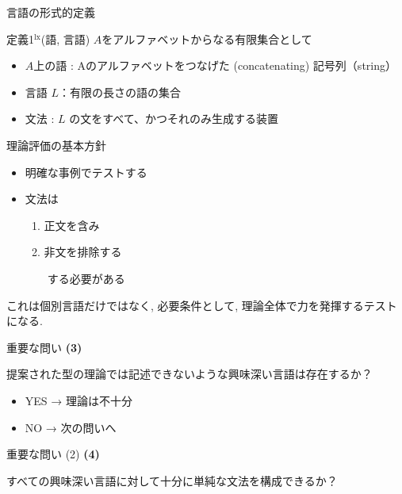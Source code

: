 \documentclass[dvipdfmx, xcolor={dvipsnames},12pt]{beamer}
\begin{document}
\begin{frame}{言語の形式的定義}

\begin{dfn}{定義1$^{\text{lx}}$(語, 言語)}
$A$をアルファベットからなる有限集合として
\begin{itemize}
\item $A$上の語 : Aのアルファベットをつなげた (concatenating) 記号列（string）
\item 言語 $L$：有限の長さの語の集合
\item 文法 : $L$ の文をすべて、かつそれのみ生成する装置
\end{itemize}
\end{dfn}

\end{frame}

\begin{frame}{理論評価の基本方針}
\begin{itemize}
    \item 明確な事例でテストする
    \item 文法は
    \begin{enumerate}
        \item 正文を含み
        \item 非文を排除する
    \end{enumerate}
　　する必要がある
\end{itemize}

これは個別言語だけではなく, 必要条件として, 理論全体で力を発揮するテストになる.

\end{frame}

\begin{frame}{重要な問い}
\textbf{(3)}\\
\begin{block}{}
提案された型の理論では記述できないような興味深い言語は存在するか？
\end{block}

\begin{itemize}
    \item YES → 理論は不十分
    \item NO → 次の問いへ
\end{itemize}
\end{frame}

\begin{frame}{重要な問い (2)}
\textbf{(4)}\\
\begin{block}{}
すべての興味深い言語に対して十分に単純な文法を構成できるか？
\end{block}
\end{frame}
\end{document}
